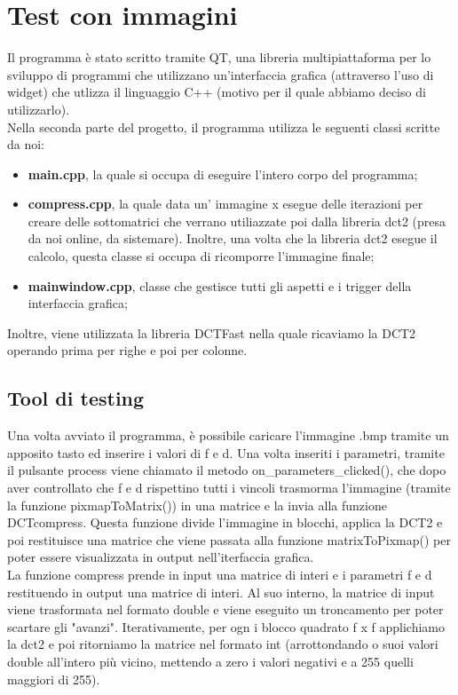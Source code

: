 \documentclass[a4paper,12pt]{report}
\newcommand{\mychapter}[2]{
    \setcounter{chapter}{#1}
    \setcounter{section}{0}
    \chapter*{#2}
    \addcontentsline{toc}{chapter}{#2}
}
\begin{document}
\mychapter{2}{Test con immagini}
Il programma è stato scritto tramite QT, una libreria multipiattaforma per lo sviluppo di programmi che utilizzano un'interfaccia grafica (attraverso l'uso di widget) che utlizza il linguaggio C++ (motivo per il quale abbiamo deciso di utilizzarlo).\\
Nella seconda parte del progetto, il programma utilizza le seguenti classi scritte da noi:
\begin{itemize}
\item \textbf{main.cpp}, la quale si occupa di eseguire l'intero corpo del programma;
\item \textbf{compress.cpp}, la quale data un' immagine x esegue delle iterazioni per creare delle sottomatrici che verrano utiliazzate poi dalla libreria dct2 (presa da noi online, da sistemare). Inoltre, una volta che la libreria dct2 esegue il calcolo, questa classe si occupa di ricomporre l'immagine finale;
\item \textbf{mainwindow.cpp}, classe che gestisce tutti gli aspetti e i trigger della interfaccia grafica;
\end{itemize}
Inoltre, viene utilizzata la libreria DCTFast nella quale ricaviamo la DCT2 operando prima per righe e poi per colonne.\\
 
\section{Tool di testing}
Una volta avviato il programma, è possibile caricare l'immagine .bmp tramite un apposito tasto ed inserire i valori di f e d. Una volta inseriti i parametri, tramite il pulsante process viene chiamato il metodo on\_parameters\_clicked(), che dopo aver controllato che f e d rispettino tutti i vincoli trasmorma l'immagine (tramite la funzione pixmapToMatrix()) in una matrice e la invia alla funzione DCTcompress. Questa funzione divide l'immagine in blocchi, applica la DCT2 e poi restituisce una matrice che viene passata alla funzione matrixToPixmap() per poter essere visualizzata in output nell'iterfaccia grafica.\\
La funzione compress prende in input una matrice di interi e i parametri f e d restituendo in output una matrice di interi. Al suo interno, la matrice di input viene trasformata nel formato double e viene eseguito un troncamento per poter scartare gli "avanzi". Iterativamente, per ogn i blocco quadrato f x f applichiamo la dct2 e poi ritorniamo la matrice nel formato int (arrottondando o suoi valori double all'intero più vicino, mettendo a zero i valori negativi e a 255 quelli maggiori di 255). 
\newpage
\end{document}
